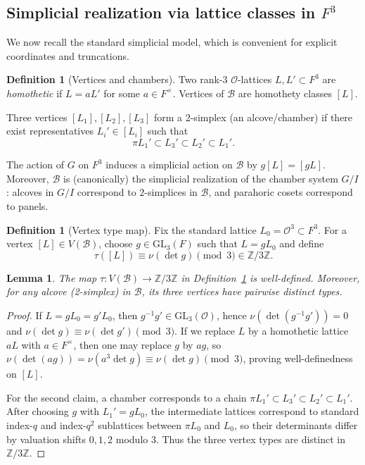 \documentclass[11pt]{amsart}
\newtheorem{lemma}[thm]{Lemma}
\theoremstyle{definition}
\newtheorem{definition}[thm]{Definition}
\theoremstyle{remark}
\numberwithin{equation}{section}
\begin{document}
\subsection{Simplicial realization via lattice classes in \texorpdfstring{$F^3$}{F3}}\label{subsec:simplicial-lattice}

We now recall the standard simplicial model, which is convenient for explicit coordinates and truncations.

\begin{definition}[Vertices and chambers]\label{def:bt-lattice-model}
Two rank-$3$ $\mathcal{O}$-lattices $L,L'\subset F^3$ are \emph{homothetic} if $L=aL'$ for some $a\in F^\times$.
Vertices of $\mathcal{B}$ are homothety classes $[L]$.

Three vertices $[L_1],[L_2],[L_3]$ form a $2$-simplex (an alcove/chamber) if there exist representatives
$L_i'\in [L_i]$ such that
\[
\pi L_1'\subset L_3'\subset L_2'\subset L_1'.
\]
\end{definition}

The action of $G$ on $F^3$ induces a simplicial action on $\mathcal{B}$ by $g[L]=[gL]$.
Moreover, $\mathcal{B}$ is (canonically) the simplicial realization of the chamber system $G/I$:
alcoves in $G/I$ correspond to $2$-simplices in $\mathcal{B}$, and parahoric cosets correspond to panels.

\begin{definition}[Vertex type map]\label{def:vertex-type-map}
Fix the standard lattice $L_0=\mathcal{O}^3\subset F^3$.
For a vertex $[L]\in V(\mathcal{B})$, choose $g\in \mathrm{GL}_3(F)$ such that $L=gL_0$ and define
\[
\tau([L]) \equiv \nu(\det g)\pmod{3}\in \mathbb{Z}/3\mathbb{Z}.
\]
\end{definition}

\begin{lemma}\label{lem:type-map-well-defined}
The map $\tau:V(\mathcal{B})\to \mathbb{Z}/3\mathbb{Z}$ in Definition~\ref{def:vertex-type-map} is well-defined.
Moreover, for any alcove (2-simplex) in $\mathcal{B}$, its three vertices have pairwise distinct types.
\end{lemma}

\begin{proof}
If $L=gL_0=g'L_0$, then $g^{-1}g'\in \mathrm{GL}_3(\mathcal{O})$, hence $\nu(\det(g^{-1}g'))=0$ and
$\nu(\det g)\equiv \nu(\det g')\pmod{3}$.
If we replace $L$ by a homothetic lattice $aL$ with $a\in F^\times$, then one may replace $g$ by $ag$,
so $\nu(\det(ag))=\nu(a^3\det g)\equiv \nu(\det g)\pmod{3}$, proving well-definedness on $[L]$.

For the second claim, a chamber corresponds to a chain
$\pi L_1'\subset L_3'\subset L_2'\subset L_1'$.
After choosing $g$ with $L_1'=gL_0$, the intermediate lattices correspond to standard index-$q$ and index-$q^2$
sublattices between $\pi L_0$ and $L_0$, so their determinants differ by valuation shifts $0,1,2$ modulo $3$.
Thus the three vertex types are distinct in $\mathbb{Z}/3\mathbb{Z}$.
\end{proof}
\end{document}
